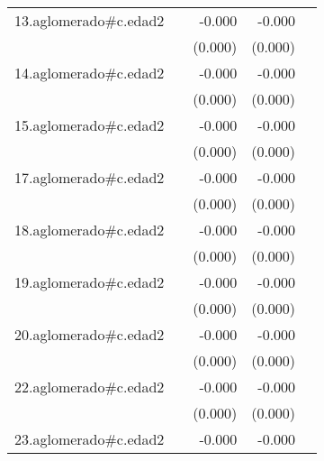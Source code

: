 {\begin{longtable}{l*{4}{D{.}{.}{-1}}}
\addlinespace
13.aglomerado#c.edad2&                     &      -0.000         &      -0.000\sym{***}&                     \\
            &                     &     (0.000)         &     (0.000)         &                     \\
\addlinespace
14.aglomerado#c.edad2&                     &      -0.000         &      -0.000         &                     \\
            &                     &     (0.000)         &     (0.000)         &                     \\
\addlinespace
15.aglomerado#c.edad2&                     &      -0.000         &      -0.000\sym{*}  &                     \\
            &                     &     (0.000)         &     (0.000)         &                     \\
\addlinespace
17.aglomerado#c.edad2&                     &      -0.000         &      -0.000         &                     \\
            &                     &     (0.000)         &     (0.000)         &                     \\
\addlinespace
18.aglomerado#c.edad2&                     &      -0.000         &      -0.000\sym{*}  &                     \\
            &                     &     (0.000)         &     (0.000)         &                     \\
\addlinespace
19.aglomerado#c.edad2&                     &      -0.000         &      -0.000         &                     \\
            &                     &     (0.000)         &     (0.000)         &                     \\
\addlinespace
20.aglomerado#c.edad2&                     &      -0.000         &      -0.000         &                     \\
            &                     &     (0.000)         &     (0.000)         &                     \\
\addlinespace
22.aglomerado#c.edad2&                     &      -0.000         &      -0.000         &                     \\
            &                     &     (0.000)         &     (0.000)         &                     \\
\addlinespace
23.aglomerado#c.edad2&                     &      -0.000         &      -0.000\sym{*}  &                     \\

\end{longtable}}
